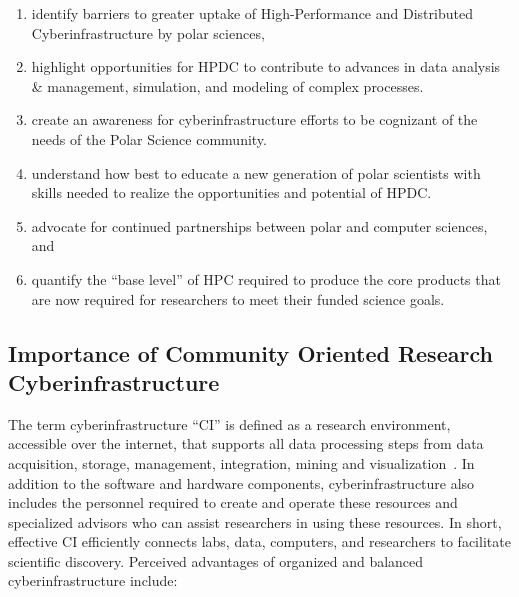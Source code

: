 \documentclass[10pt,letterpaper,draft]{article}
\begin{document}
 
\begin{enumerate}[label=\roman*., itemsep=0pt, topsep=0pt]

\item identify barriers to greater uptake of High-Performance and Distributed Cyberinfrastructure by polar sciences,

\item highlight opportunities for HPDC to contribute to advances in data analysis \& management, simulation, and modeling of complex processes.

\item create an awareness for cyberinfrastructure efforts to be cognizant of the needs of the Polar Science community.

\item understand how best to educate a new generation of polar scientists with skills needed to realize the opportunities and potential of HPDC.

\item advocate for continued partnerships between polar and computer sciences, and

\item quantify the ``base level'' of HPC required to produce the core products that are now required for researchers to meet their funded science goals.

\end{enumerate}

\subsection*{Importance of Community Oriented Research Cyberinfrastructure}

The term cyberinfrastructure ``CI'' is defined as a research environment, accessible over the internet, that supports all data processing steps from data acquisition, storage, management, integration, mining and visualization~\cite{HackHolyoke_2016}. In addition to the software and hardware components, cyberinfrastructure also includes the personnel required to create and operate these resources and specialized advisors who can assist researchers in using these resources. In short, effective CI efficiently connects labs, data, computers, and researchers to facilitate scientific discovery. Perceived advantages of organized and balanced cyberinfrastructure include:
\end{document}

